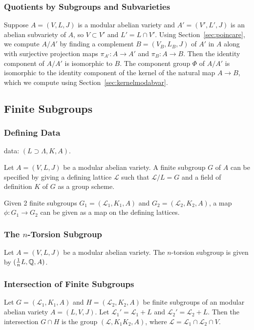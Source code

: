 \documentclass{article}
\begin{document}
\subsubsection{Quotients by Subgroups and Subvarieties}


Suppose $A = (V, L, J)$ is a modular abelian variety and $A' = (V',
L', J)$ is an abelian subvariety of $A$, so $V\subset V'$ and $L' =
L\cap V'$.  Using Section~\ref{sec:poincare}, we compute $A/A'$ by
finding a complement $B=(V_B,L_B,J)$ of $A'$ in $A$ along with
surjective projection maps $\pi_{A'}: A \to A'$ and $\pi_B: A\to B$.
Then the identity component of $A/A'$ is isomorphic to $B$.  The
component group $\Phi$ of $A/A'$ is isomorphic to the identity
component of the kernel of the natural map $A \to B$, which we compute
using Section~\ref{sec:kernelmodabvar}.

\subsection{Finite Subgroups}


\subsubsection{Defining Data}


data: $(L\supset \Lambda, K, A)$.

Let $A=(V, L, J)$ be a modular abelian variety. A finite subgroup $G$ of $A$
can be specified by giving a defining lattice $\mathcal{L}$ such that
$\mathcal{L}/L = G$ and a field of definition $K$ of $G$ as a group scheme. 

Given 2 finite subgroups $G_1=(\mathcal{L}_1, K_1, A)$ and $G_2=(\mathcal{L}_2,
K_2, A)$, a map $\phi: G_1\to G_2$ can be given as a map on the defining
lattices.


\subsubsection{The $n$-Torsion Subgroup}

Let $A=(V, L, J)$ be a modular abelian variety. The $n$-torsion subgroup is
given by $(\frac{1}{n} L, \mathbb{Q}, A)$.



\subsubsection{Intersection of Finite Subgroups}

Let $G=(\mathcal{L}_1, K_1, A)$ and $H=(\mathcal{L}_2, K_2, A)$ be finite
subgroups of an modular abelian variety $A=(L, V, J)$. Let $\mathcal{L}_1 ' =
\mathcal{L}_1+L$ and $\mathcal{L}_2 ' = \mathcal{L}_2 + L$. Then the
intersection $G\cap H$ is the group $(\mathcal{L}, K_1K_2, A)$, where
$\mathcal{L}=\mathcal{L}_1\cap \mathcal{L}_2 \cap V$.
\end{document}
